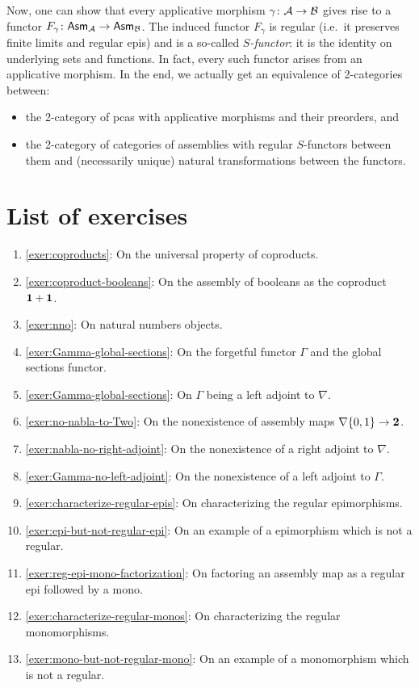 Now, one can show that every applicative morphism \(\gamma \colon \mathcal A \to \mathcal B\)
gives rise to a functor \(F_\gamma \colon \mathsf{Asm}_{\mathcal A} \to \mathsf{Asm}_{\mathcal B}\).
%
The induced functor \(F_\gamma\) is regular (i.e.\ it preserves finite limits
and regular epis) and is a so-called \emph{\(S\)-functor}: it is the
identity on underlying sets and functions.
%
In fact, every such functor arises from an applicative morphism.
%
In the end, we actually get an equivalence of
2-categories~\cite[Theorem~1.6.2]{vanOosten2008} between:
\begin{itemize}
\item the 2-category of pcas with applicative morphisms and their preorders, and
\item the 2-category of categories of assemblies with regular \(S\)-functors between
  them and (necessarily unique) natural transformations between the functors.
\end{itemize}




\section{List of exercises}
\begin{enumerate}
\item \cref{exer:coproducts}: On the universal property of coproducts.
\item \cref{exer:coproduct-booleans}: On the assembly of booleans as the
  coproduct \(\mathbf 1 + \mathbf 1\).
\item \cref{exer:nno}: On natural numbers objects.
\item \cref{exer:Gamma-global-sections}: On the forgetful functor \(\Gamma\) and
  the global sections functor.
\item \cref{exer:Gamma-global-sections}: On \(\Gamma\) being a left adjoint to
  \(\nabla\).
\item \cref{exer:no-nabla-to-Two}: On the nonexistence of assembly maps
  \(\nabla\{0,1\} \to \mathbf 2\).
\item \cref{exer:nabla-no-right-adjoint}: On the nonexistence of a right
  adjoint to \(\nabla\).
\item \cref{exer:Gamma-no-left-adjoint}: On the nonexistence of a left
  adjoint to \(\Gamma\).
\item \cref{exer:characterize-regular-epis}: On characterizing the regular
  epimorphisms.
\item \cref{exer:epi-but-not-regular-epi}: On an example of a epimorphism
  which is not a regular.
\item \cref{exer:reg-epi-mono-factorization}: On factoring an assembly map as a
  regular epi followed by a mono.
\item \cref{exer:characterize-regular-monos}: On characterizing the regular
  monomorphisms.
\item \cref{exer:mono-but-not-regular-mono}: On an example of a monomorphism
  which is not a regular.
\end{enumerate}

